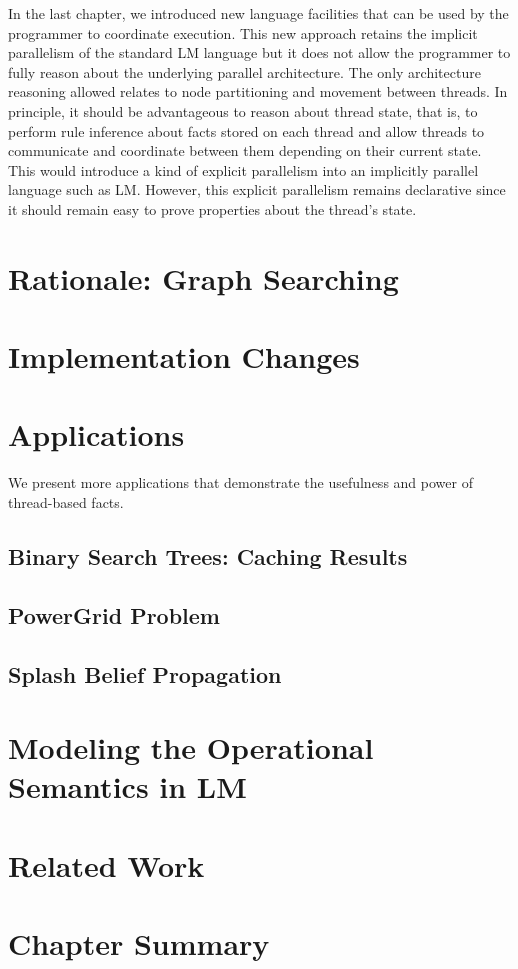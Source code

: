 In the last chapter, we introduced new language facilities that can be used by
the programmer to coordinate execution. This new approach retains the implicit
parallelism of the standard LM language but it does not allow the programmer to
fully reason about the underlying parallel architecture. The only architecture
reasoning allowed relates to node partitioning and movement between threads. In
principle, it should be advantageous to reason about thread state, that is, to
perform rule inference about facts stored on each thread and allow threads to
communicate and coordinate between them depending on their current state. This
would introduce a kind of explicit parallelism into an implicitly parallel
language such as LM. However, this explicit parallelism remains declarative
since it should remain easy to prove properties about the thread's state.

\section{Rationale: Graph Searching}


\section{Implementation Changes}


\section{Applications}

We present more applications that demonstrate the usefulness and power of thread-based facts.

\subsection{Binary Search Trees: Caching Results}


\subsection{PowerGrid Problem}


\subsection{Splash Belief Propagation}


\section{Modeling the Operational Semantics in LM}


\section{Related Work}


\section{Chapter Summary}


